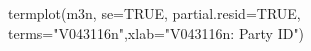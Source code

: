 \begin{Schunk}
\begin{Sinput}
 termplot(m3n, se=TRUE, partial.resid=TRUE, terms="V043116n",xlab="V043116n: Party ID")
\end{Sinput}
\end{Schunk}
